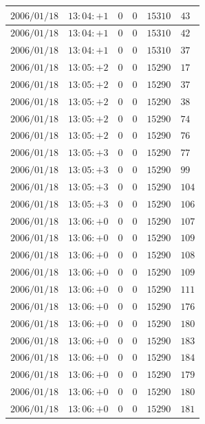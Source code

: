 \documentclass[a4j,papersize,disablejfam,slide,14pt]{jsarticle}
\begin{document}
\begin{description}
\begin{center}
\begin{longtable}{|l|l|l|l|l|l|}
					$2006/01/18$ & $13:04:+1$  & $0$ & $0$ & $15310$ & $43$ \\ \hline
					$2006/01/18$ & $13:04:+1$  & $0$ & $0$ & $15310$ & $42$ \\ \hline
					$2006/01/18$ & $13:04:+1$  & $0$ & $0$ & $15310$ & $37$ \\ \hline
					$2006/01/18$ & $13:05:+2$  & $0$ & $0$ & $15290$ & $17$ \\ \hline
					$2006/01/18$ & $13:05:+2$  & $0$ & $0$ & $15290$ & $37$ \\ \hline
					$2006/01/18$ & $13:05:+2$  & $0$ & $0$ & $15290$ & $38$ \\ \hline
					$2006/01/18$ & $13:05:+2$  & $0$ & $0$ & $15290$ & $74$ \\ \hline
					$2006/01/18$ & $13:05:+2$  & $0$ & $0$ & $15290$ & $76$ \\ \hline
					$2006/01/18$ & $13:05:+3$  & $0$ & $0$ & $15290$ & $77$ \\ \hline
					$2006/01/18$ & $13:05:+3$  & $0$ & $0$ & $15290$ & $99$ \\ \hline
					$2006/01/18$ & $13:05:+3$  & $0$ & $0$ & $15290$ & $104$ \\ \hline
					$2006/01/18$ & $13:05:+3$  & $0$ & $0$ & $15290$ & $106$ \\ \hline
					$2006/01/18$ & $13:06:+0$  & $0$ & $0$ & $15290$ & $107$ \\ \hline
					$2006/01/18$ & $13:06:+0$  & $0$ & $0$ & $15290$ & $109$ \\ \hline
					$2006/01/18$ & $13:06:+0$  & $0$ & $0$ & $15290$ & $108$ \\ \hline
					$2006/01/18$ & $13:06:+0$  & $0$ & $0$ & $15290$ & $109$ \\ \hline
					$2006/01/18$ & $13:06:+0$  & $0$ & $0$ & $15290$ & $111$ \\ \hline
					$2006/01/18$ & $13:06:+0$  & $0$ & $0$ & $15290$ & $176$ \\ \hline
					$2006/01/18$ & $13:06:+0$  & $0$ & $0$ & $15290$ & $180$ \\ \hline
					$2006/01/18$ & $13:06:+0$  & $0$ & $0$ & $15290$ & $183$ \\ \hline
					$2006/01/18$ & $13:06:+0$  & $0$ & $0$ & $15290$ & $184$ \\ \hline
					$2006/01/18$ & $13:06:+0$  & $0$ & $0$ & $15290$ & $179$ \\ \hline
					$2006/01/18$ & $13:06:+0$  & $0$ & $0$ & $15290$ & $180$ \\ \hline
					$2006/01/18$ & $13:06:+0$  & $0$ & $0$ & $15290$ & $181$ \\ \hline

\end{longtable}
\end{center}
\end{description}
\end{document}
